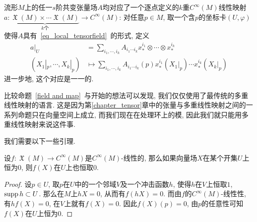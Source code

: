 \begin{prop}\label{field and map}
    流形$M$上的任一$s$阶共变张量场$A$均对应了一个逐点定义的$k$重$C^\infty(M)$线性映射$a:\underbrace{\mfrakX(M)\times\cdots\mfrakX(M)}_{k\text{个}}\to C^\infty(M)$:
    对任意$p\in M$, 取一个含$p$的坐标卡$(U,\varphi)$使得$A$具有~\eqref{eq_local_tensorfield}~的形式, 定义
    \begin{align*}
        a|_U&=\sum_{i_1,\cdots,i_k}A_{i_1\cdots i_k}x^{i_1}_*\otimes\cdots\otimes x^{i_k}_*\\
        (X_1|_p,\cdots,X_k|_p)&\mapsto\sum_{i_1,\cdots,i_k}A_{i_1\cdots i_k}(p)x^{i_1}_*(X_1|_p)\cdots x^{i_k}_*(X_k|_p)
    \end{align*}
    进一步地, 这个对应是一一的.
\end{prop}

比较命题~\ref{field and map}~与开始的想法可以发现, 我们仅仅使用了最传统的多重线性映射的语言.
这是因为第\ref{chapter_tensor}章中的张量与多重线性映射之间的一系列命题只在向量空间上成立, 而我们现在在处理环上的模, 因此我们就只能用多重线性映射来说这件事.

我们需要以下一些引理.

\begin{lem}\label{local operator}
    设$f:\mfrakX(M)\to C^\infty(M)$是$C^\infty(M)$-线性的, 那么如果向量场$X$在某个开集$U$上恒为$0$, 则$f(X)$在$U$上也恒取$0$.
\end{lem}
\begin{proof}
    设$p\in U$, 取$p$在$U$中的一个邻域$V$及一个冲击函数$h$, 使得$h$在$V$上恒取$1$, $\operatorname{supp}{h}\subset U$.
    那么在$M$上$hX=0$, 从而有$f(hX)=0$.
    而由$f$的$C^\infty(M)$-线性性, 有$hf(X)=0$, 在$V$上就有$f(X)=0$.
    因此$f(X)(p)=0$, 由$p$的任意性可知$f(X)$在$U$上恒为$0$.
\end{proof}


